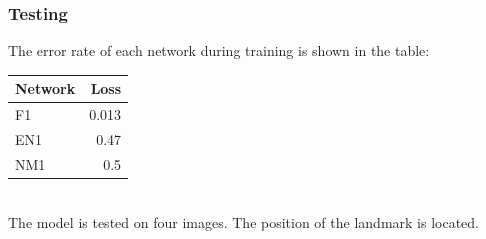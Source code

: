 \subsubsection{Testing}
The error rate of each network during training is shown in the table:\\
\begin{table}[h!]
	\centering
	\begin{tabular}{l r}
	Network & Loss \\ \hline
	F1 & 0.013 \\ \hline
	EN1 & 0.47\\ \hline
	NM1 &  0.5
	\end{tabular}
\end{table}\\
The model is tested on four images. The position of the landmark is located.
\begin{figure}[h!]
\centering
{}~~
\\
~~

\end{figure}
